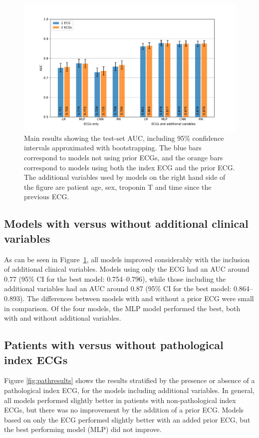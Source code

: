 \documentclass[preprint]{elsarticle}
\begin{document}
\begin{figure}[h!]
\includegraphics[width=\linewidth]{figures/main_results.pdf}
\caption{Main results showing the test-set AUC, including 95\% confidence intervals approximated with bootstrapping. The blue bars correspond to models not using prior ECGs, and the orange bars correspond to models using both the index ECG and the prior ECG. The additional variables used by models on the right hand side of the figure are patient age, sex, troponin T and time since the previous ECG.}
\label{fig:mainresults}
\end{figure}

\subsection{Models with versus without additional clinical variables}
As can be seen in Figure~\ref{fig:mainresults}, all models improved considerably with the inclusion of additional clinical variables. Models using only the ECG had an AUC around 0.77 (95\% CI for the best model: 0.754--0.796), while those including the additional variables had an AUC around 0.87 (95\% CI for the best model: 0.864--0.893). The differences between models with and without a prior ECG were small in comparison. Of the four models, the MLP model performed the best, both with and without additional variables.

\subsection{Patients with versus without pathological index ECGs}
Figure \ref{fig:pathresults} shows the results stratified by the presence or absence of a pathological index ECG, for the models including additional variables. In general, all models performed slightly better in patients with non-pathological index ECGs, but there was no improvement by the addition of a prior ECG. Models based on only the ECG performed slightly better with an added prior ECG, but the best performing model (MLP) did not improve. 
\end{document}
